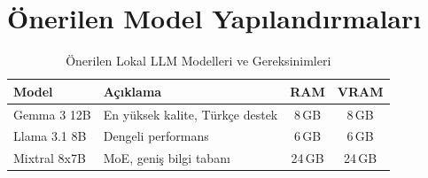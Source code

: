\section{\"{O}nerilen Model Yap{\i}land{\i}rmalar{\i}}

\begin{table}[H]
\centering
\caption{\"{O}nerilen Lokal LLM Modelleri ve Gereksinimleri}
\label{tab:models}
\begin{tabularx}{\textwidth}{lXcc}
\toprule
\color{chapterBlue}\textbf{Model} & \color{chapterBlue}\textbf{A\c{c}{\i}klama} & \color{chapterBlue}\textbf{RAM} & \color{chapterBlue}\textbf{VRAM} \\
\midrule
Gemma 3 12B & En y\"{u}ksek kalite, T\"{u}rk\c{c}e destek & 8\,GB & 8\,GB \\
Llama 3.1 8B & Dengeli performans & 6\,GB & 6\,GB \\
Mixtral 8x7B & MoE, geni\c{s} bilgi taban{\i} & 24\,GB & 24\,GB \\
\bottomrule
\end{tabularx}
\end{table}

